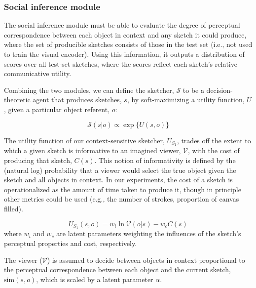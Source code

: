 \documentclass[9pt,twocolumn,twoside]{pnas-new}
\newcommand{\mwu}[1]{{\color{green}{[mwu: #1]}}}
\begin{document}
{\mwu{We split the datasets of images and sketches into three groups: a training set, a validation set, and a test set. Post training, we use the parameters from the epoch with the highest validation accuracy i.e. early stopping ADD CITATION. During training, the model never sees any test data.}

\subsubsection*{Social inference module}

The social inference module must be able to evaluate the degree of perceptual correspondence between each object in context and any sketch it could produce, where the set of producible sketches consists of those in the test set (i.e., not used to train the visual encoder). Using this information, it outputs a distribution of scores over all test-set sketches, where the scores reflect each sketch's relative communicative utility.

Combining the two modules, we can define the sketcher, $\mathcal{S}$ to be a decision-theoretic agent that produces sketches, $s$, by soft-maximizing a utility function, $U$, given a particular object referent, $o$:

\begin{equation}
\mathcal{S}(s|o) \propto \exp\{{U(s,o)\}}
\end{equation}

The utility function of our context-sensitive sketcher, $U_{S_1}$, trades off the extent to which a given sketch is informative to an imagined viewer, $\mathcal{V}$, with the cost of producing that sketch, $C(s)$. This notion of informativity is defined by the (natural log) probability that a viewer would select the true object given the sketch and all objects in context. In our experiments, the cost of a sketch is operationalized as the amount of time taken to produce it, though in principle other metrics could be used (e.g., the number of strokes, proportion of canvas filled).

\begin{equation} 
U_{S_1}(s, o) = w_i \ln \mathcal{V}(o|s) - w_c C(s)
\end{equation}
where $w_i$ and $w_c$ are latent parameters weighting the influences of the sketch's perceptual properties and cost, respectively.

The viewer ($\mathcal{V}$) is assumed to decide between objects in context proportional to the perceptual correspondence between each object and the current sketch, $\textrm{sim}(s,o)$, which is scaled by a latent parameter $\alpha$.

}
\end{document}
